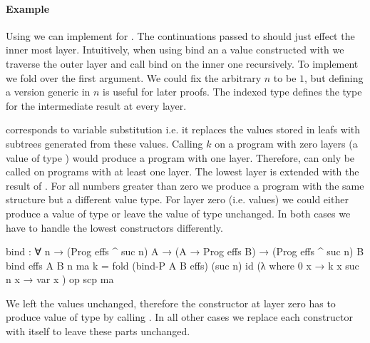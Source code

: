 \paragraph{Example}
Using  we can implement \AgdaFunction{>>=} for
\AgdaSpace{}\AgdaSpace{}.
The continuations  passed to \AgdaFunction{>>=} should just
effect the inner most layer.
Intuitively, when using bind an a value constructed with
 we traverse the outer layer and call bind on the
inner one recursively.
To implement \AgdaFunction{>>=} we fold over the first argument.
We could fix the arbitrary $n$ to be $1$, but defining a version generic in $n$
is useful for later proofs.
The  indexed type  defines the type for the
intermediate result at every layer.

\bind{} corresponds to variable substitution i.e. it replaces the values stored
in  leafs with subtrees generated from these
values.
Calling $k$ on a program with zero layers (a value of type )
would produce a program with one layer.
Therefore, \bind{} can only be called on programs with at least one layer.
The lowest layer is extended with the result of .
For all numbers greater than zero we produce a program with the same structure
but a different value type.
For layer zero (i.e. values) we could either produce a value of type 
\AgdaSpace{}\AgdaSpace{}
or leave the value of type  unchanged.
In both cases we have to handle the lowest 
constructors differently.

\begin{code}
bind : ∀ n → (Prog effs ^ suc n) A → (A → Prog effs B) →
  (Prog effs ^ suc n) B
bind {effs} {A} {B} n ma k = fold (bind-P A B effs) (suc n) id (λ where
    {0}      x → k x
    {suc n}  x → var x
  ) op scp ma
\end{code}
We left the values unchanged, therefore the 
constructor at layer zero has to produce value of type 
\AgdaSpace{}\AgdaSpace{}
by calling .
In all other cases we replace each constructor with itself to leave these parts
unchanged.

